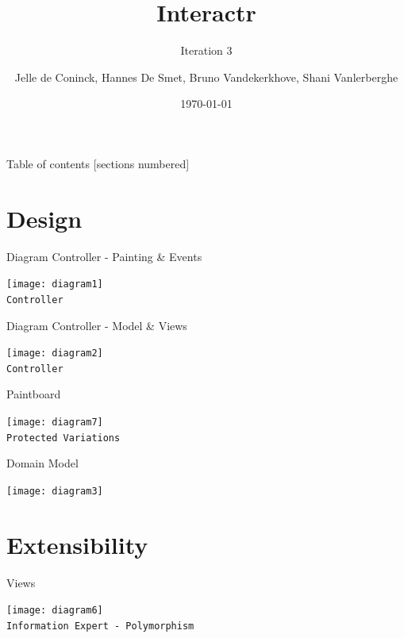 \documentclass[10pt]{beamer}
\title{Interactr}
\subtitle{Iteration 3}
\date{\today}
\author{Jelle de Coninck, Hannes De Smet, Bruno Vandekerkhove, Shani Vanlerberghe}
\institute{KULeuven}
\begin{document}
\maketitle

\begin{frame}{Table of contents}
  [sections numbered]
  \tableofcontents[hideallsubsections]
\end{frame}

\section{Design}

\begin{frame}[fragile]{Diagram Controller - Painting \& Events}
\begin{center}
\texttt{[image: diagram1]}
\vspace{0.5cm}\\\texttt{Controller}
\end{center}
\end{frame}

\begin{frame}[fragile]{Diagram Controller - Model \& Views}
\begin{center}
\texttt{[image: diagram2]}
\vspace{0.5cm}\\\texttt{Controller}
\end{center}
\end{frame}

\begin{frame}[fragile]{Paintboard}
\begin{center}
\texttt{[image: diagram7]}
\vspace{0.5cm}\\\texttt{Protected Variations}
\end{center}
\end{frame}

\begin{frame}[fragile]{Domain Model}
	\begin{center}
	\texttt{[image: diagram3]}
	\end{center}
\end{frame}

\section{Extensibility}

\begin{frame}[fragile]{Views}
	\begin{center}
	\texttt{[image: diagram6]}
	\vspace{0.5cm}\\\texttt{Information Expert - Polymorphism}
	\end{center}
\end{frame}
\end{document}
